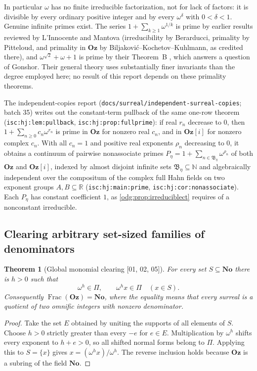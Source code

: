 \documentclass[11pt,oneside]{article}
\numberwithin{equation}{section}
\newtheorem{theorem}{Theorem}[section]
\theoremstyle{definition}
\theoremstyle{remark}
\newcommand{\No}{\mathbf{No}}
\newcommand{\Oz}{\mathbf{Oz}}
\newcommand{\R}{\mathbb R}
\newcommand{\N}{\mathbb N}
\newcommand{\Frac}{\operatorname{Frac}}
\newcommand{\src}[1]{\textup{\textsf{\small[#1]}}}
\newcommand{\replabel}[1]{\nolinkurl{#1}}
\newcommand{\fn}[1]{\nolinkurl{#1}}
\newcommand{\Og}{\Oz[i]}
\begin{document}
In particular $\omega$ has no finite irreducible factorization, not for lack
of factors: it is divisible by every ordinary positive integer and by every
$\omega^\delta$ with $0<\delta<1$. Genuine infinite primes exist. The series
$1+\sum_{k\ge1}\omega^{1/k}$ is prime by earlier results reviewed by
L'Innocente and Mantova \cite[Section 1.3]{LM} (irreducibility by Berarducci,
primality by Pitteloud, and primality in $\Oz$ by
Biljakovi\'c--Kochetov--Kuhlmann, as credited there), and
$\omega^{\sqrt2}+\omega+1$ is prime by their Theorem~B \cite[Theorem B]{LM},
which answers a question of Gonshor. Their general theory uses substantially
finer invariants than the degree employed here; no result of this report
depends on these primality theorems.

The independent-copies report (\fn{docs/surreal/independent-surreal-copies};
batch 35) writes out the constant-term pullback of the same one-row theorem
(\replabel{isc:hj:lem:pullback}, \replabel{isc:hj:prop:fullprime}): if real
$r_n$ decrease to $0$, then $1+\sum_{n\ge0}c_n\omega^{r_n}$ is prime in $\Oz$
for nonzero real $c_n$, and in $\Og$ for nonzero complex $c_n$. With all
$c_n=1$ and positive real exponents $\rho_n$ decreasing to $0$, it obtains a
continuum of pairwise nonassociate primes
$P_\eta=1+\sum_{n\in\mathfrak B_\eta}\omega^{\rho_n}$ of both $\Oz$ and $\Og$,
indexed by almost disjoint infinite sets $\mathfrak B_\eta\subseteq\N$ and
algebraically independent over the compositum of the complex full Hahn fields
on two exponent groups $A,B\subseteq\R$ (\replabel{isc:hj:main:prime},
\replabel{isc:hj:cor:nonassociate}). Each $P_\eta$ has constant coefficient
$1$, as \cref{odg:prop:irreduciblect} requires of a nonconstant irreducible.

\subsection{Clearing arbitrary set-sized families of denominators}

\begin{theorem}[Global monomial clearing \src{01, 02, 05}]\label{odg:thm:fractions}
For every set $S\subseteq\No$ there is $h>0$ such that
\[
 \omega^h\in\Pi,\qquad \omega^h x\in\Pi\quad(x\in S).
\]
Consequently $\Frac(\Oz)=\No$, where the equality means that every surreal
is a quotient of two omnific integers with nonzero denominator.
\end{theorem}
\begin{proof}
Take the set $E$ obtained by uniting the supports of all elements of $S$.
Choose $h>0$ strictly greater than every $-e$ for $e\in E$.
Multiplication by $\omega^h$ shifts every exponent to $h+e>0$, so all
shifted normal forms belong to $\Pi$. Applying this to $S=\{x\}$
gives $x=(\omega^h x)/\omega^h$. The reverse inclusion holds because $\Oz$
is a subring of the field $\No$.
\end{proof}
\end{document}
